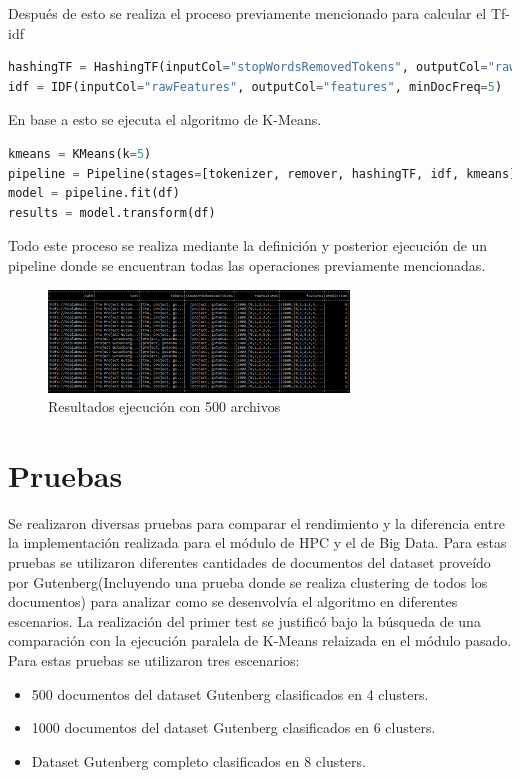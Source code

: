 \documentclass[fleqn,10pt]{SelfArx} %
\begin{document}
Después de esto se realiza el proceso previamente mencionado para calcular el Tf-idf

\begin{lstlisting}[language=Python]
hashingTF = HashingTF(inputCol="stopWordsRemovedTokens", outputCol="rawFeatures", numFeatures=2000)
idf = IDF(inputCol="rawFeatures", outputCol="features", minDocFreq=5)

\end{lstlisting}

En base a esto se ejecuta el algoritmo de K-Means.

\begin{lstlisting}[language=Python]
kmeans = KMeans(k=5)
pipeline = Pipeline(stages=[tokenizer, remover, hashingTF, idf, kmeans])
model = pipeline.fit(df)
results = model.transform(df)
\end{lstlisting}

Todo este proceso se realiza mediante la definición y posterior ejecución de un pipeline donde se encuentran todas las operaciones previamente mencionadas.

\begin{figure}[ht]\centering
\includegraphics[width=80mm,]{Resultado}
\caption{Resultados ejecución con 500 archivos}
\label{fig:tabla1}
\end{figure}

\section{Pruebas}
Se realizaron diversas pruebas para comparar el rendimiento y la diferencia entre la implementación realizada para el módulo de HPC y el de Big Data. 
Para estas pruebas se utilizaron diferentes cantidades de documentos del dataset proveído por Gutenberg(Incluyendo una prueba donde se realiza clustering de todos los documentos) para analizar como se desenvolvía el algoritmo en diferentes escenarios.
La realización del primer test se justificó bajo la búsqueda de una comparación con la ejecución paralela de K-Means relaizada en el módulo pasado. Para estas pruebas se utilizaron tres escenarios:
\begin{itemize}
  \item 500 documentos del dataset Gutenberg clasificados en 4 clusters.
  \item 1000 documentos del dataset Gutenberg clasificados en 6 clusters.
  \item Dataset Gutenberg completo clasificados en 8 clusters.
\end{itemize}
\end{document}
